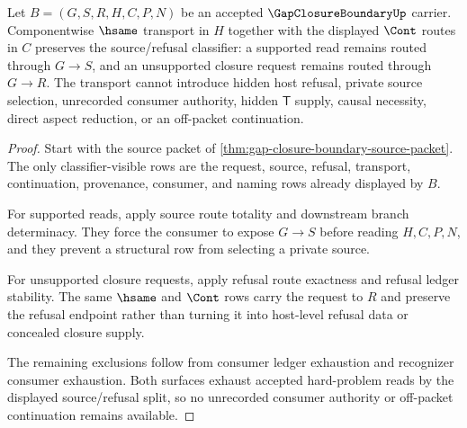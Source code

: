 \begin{theorem}
\label{thm:gap-closure-boundary-classifier-stability}
Let $B=(G,S,R,H,C,P,N)$ be an accepted $\GapClosureBoundaryUp$ carrier. Componentwise $\hsame$ transport in $H$ together with the displayed $\Cont$ routes in $C$ preserves the source/refusal classifier: a supported read remains routed through $G \longrightarrow S$, and an unsupported closure request remains routed through $G \longrightarrow R$. The transport cannot introduce hidden host refusal, private source selection, unrecorded consumer authority, hidden $\mathsf{T}$ supply, causal necessity, direct aspect reduction, or an off-packet continuation.
\end{theorem}
\begin{proof}
Start with the source packet of \autoref{thm:gap-closure-boundary-source-packet}. The only classifier-visible rows are the request, source, refusal, transport, continuation, provenance, consumer, and naming rows already displayed by $B$.

For supported reads, apply source route totality and downstream branch determinacy. They force the consumer to expose $G \longrightarrow S$ before reading $H,C,P,N$, and they prevent a structural row from selecting a private source.

For unsupported closure requests, apply refusal route exactness and refusal ledger stability. The same $\hsame$ and $\Cont$ rows carry the request to $R$ and preserve the refusal endpoint rather than turning it into host-level refusal data or concealed closure supply.

The remaining exclusions follow from consumer ledger exhaustion and recognizer consumer exhaustion. Both surfaces exhaust accepted hard-problem reads by the displayed source/refusal split, so no unrecorded consumer authority or off-packet continuation remains available.
\end{proof}

